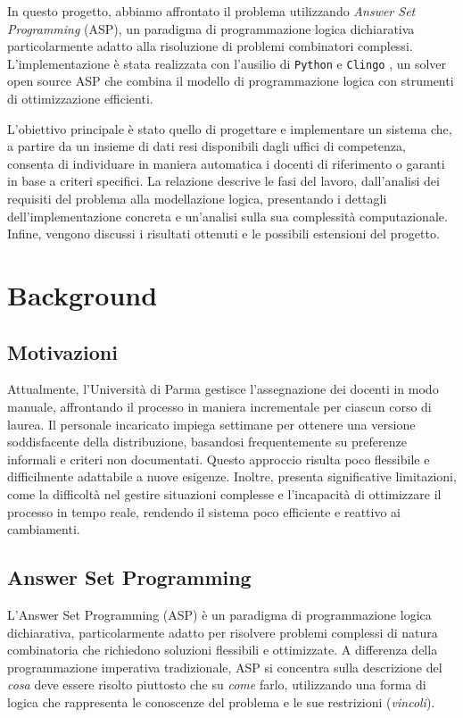 \documentclass[draft,journal]{IEEEtran}
\begin{document}
In questo progetto, abbiamo affrontato il problema utilizzando \textit{Answer
Set Programming} (ASP), un paradigma di programmazione logica dichiarativa
particolarmente adatto alla risoluzione di problemi combinatori complessi.
L'implementazione è stata realizzata con l'ausilio di \texttt{Python}
\cite{python} e \texttt{Clingo} \cite{clingo}, un solver open source ASP che
combina il modello di programmazione logica con strumenti di ottimizzazione
efficienti.

L'obiettivo principale è stato quello di progettare e implementare un sistema
che, a partire da un insieme di dati resi disponibili dagli uffici di
competenza, consenta di individuare in maniera automatica i docenti di
riferimento o garanti in base a criteri specifici. La relazione descrive le fasi
del lavoro, dall'analisi dei requisiti del problema alla modellazione logica,
presentando i dettagli dell'implementazione concreta e un'analisi sulla sua
complessità computazionale. Infine, vengono discussi i risultati ottenuti e le
possibili estensioni del progetto.


\section{Background}
\subsection{Motivazioni}
Attualmente, l'Università di Parma gestisce l'assegnazione dei docenti in modo
manuale, affrontando il processo in maniera incrementale per ciascun corso di
laurea. Il personale incaricato impiega settimane per ottenere una versione
soddisfacente della distribuzione, basandosi frequentemente su preferenze
informali e criteri non documentati. Questo approccio risulta poco flessibile e
difficilmente adattabile a nuove esigenze. Inoltre, presenta significative
limitazioni, come la difficoltà nel gestire situazioni complesse e l'incapacità
di ottimizzare il processo in tempo reale, rendendo il sistema poco efficiente e
reattivo ai cambiamenti.

\subsection{Answer Set Programming}
L'Answer Set Programming (ASP) è un paradigma di programmazione logica
dichiarativa, particolarmente adatto per risolvere problemi complessi di natura
combinatoria che richiedono soluzioni flessibili e ottimizzate. A differenza
della programmazione imperativa tradizionale, ASP si concentra sulla descrizione
del \textit{cosa} deve essere risolto piuttosto che su	\textit{come} farlo,
utilizzando una forma di logica che rappresenta le conoscenze del problema e le
sue restrizioni (\textit{vincoli}).
\end{document}
